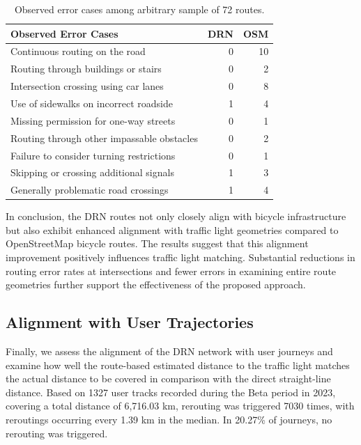 \begin{table}[htbp]
\centering
\begin{tabular}{@{}lrr@{}}
\hline
\textbf{Observed Error Cases} & \textbf{DRN} & \textbf{OSM} \\ \hline
Continuous routing on the road & 0 & 10 \\
Routing through buildings or stairs & 0 & 2 \\
Intersection crossing using car lanes & 0 & 8 \\
Use of sidewalks on incorrect roadside & 1 & 4 \\
Missing permission for one-way streets & 0 & 1 \\
Routing through other impassable obstacles & 0 & 2 \\
Failure to consider turning restrictions & 0 & 1 \\
Skipping or crossing additional signals & 1 & 3 \\
Generally problematic road crossings & 1 & 4 \\
\hline
\end{tabular}
\caption{Observed error cases among arbitrary sample of 72 routes.}%
\label{tab:accuracy-comparison}%
\end{table}

In conclusion, the DRN routes not only closely align with bicycle infrastructure but also exhibit enhanced alignment with traffic light geometries compared to OpenStreetMap bicycle routes. The results suggest that this alignment improvement positively influences traffic light matching. Substantial reductions in routing error rates at intersections and fewer errors in examining entire route geometries further support the effectiveness of the proposed approach.

\subsection{Alignment with User Trajectories}

Finally, we assess the alignment of the DRN network with user journeys and examine how well the route-based estimated distance to the traffic light matches the actual distance to be covered in comparison with the direct straight-line distance. Based on 1327 user tracks recorded during the Beta period in 2023, covering a total distance of 6,716.03 km, rerouting was triggered 7030 times, with reroutings occurring every 1.39 km in the median. In 20.27\% of journeys, no rerouting was triggered.

